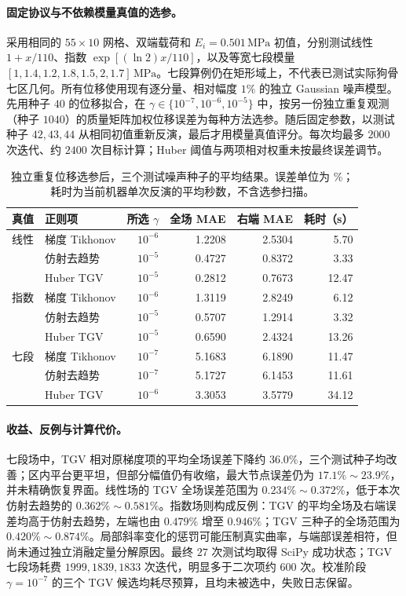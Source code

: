 \documentclass[11pt,a4paper]{ctexart}
\begin{document}
\paragraph{固定协议与不依赖模量真值的选参。}
采用相同的 $55\times10$ 网格、双端载荷和 $E_i=0.501\,\mathrm{MPa}$ 初值，分别测试线性 $1+x/110$、指数 $\exp[(\ln2)x/110]$，以及等宽七段模量 $[1,1.4,1.2,1.8,1.5,2,1.7]\,\mathrm{MPa}$。七段算例仍在矩形域上，不代表已测试实际狗骨七区几何。所有位移使用现有逐分量、相对幅度 $1\%$ 的独立 Gaussian 噪声模型。先用种子 $40$ 的位移拟合，在 $\gamma\in\{10^{-7},10^{-6},10^{-5}\}$ 中，按另一份独立重复观测（种子 $1040$）的质量矩阵加权位移误差为每种方法选参。随后固定参数，以测试种子 $42,43,44$ 从相同初值重新反演，最后才用模量真值评分。每次均最多 $2000$ 次迭代、约 $2400$ 次目标计算；Huber 阈值与两项相对权重未按最终误差调节。

\begin{table}[htbp]
\centering
\small
\caption{独立重复位移选参后，三个测试噪声种子的平均结果。误差单位为 \%；耗时为当前机器单次反演的平均秒数，不含选参扫描。}
\label{tab:tgv_results}
\begin{tabular}{llrrrr}
\toprule
真值 & 正则项 & 所选 $\gamma$ & 全场 MAE & 右端 MAE & 耗时（s） \\
\midrule
线性 & 梯度 Tikhonov & $10^{-6}$ & 1.2208 & 2.5304 & 5.70 \\
 & 仿射去趋势 & $10^{-5}$ & 0.4727 & 0.8372 & 3.33 \\
 & Huber TGV & $10^{-5}$ & 0.2812 & 0.7673 & 12.47 \\
指数 & 梯度 Tikhonov & $10^{-6}$ & 1.3119 & 2.8249 & 6.12 \\
 & 仿射去趋势 & $10^{-5}$ & 0.5707 & 1.2914 & 3.32 \\
 & Huber TGV & $10^{-5}$ & 0.6590 & 2.4324 & 13.26 \\
七段 & 梯度 Tikhonov & $10^{-7}$ & 5.1683 & 6.1890 & 11.47 \\
 & 仿射去趋势 & $10^{-7}$ & 5.1727 & 6.1453 & 11.61 \\
 & Huber TGV & $10^{-6}$ & 3.3053 & 3.5779 & 34.12 \\
\bottomrule
\end{tabular}
\end{table}

\paragraph{收益、反例与计算代价。}
七段场中，TGV 相对原梯度项的平均全场误差下降约 $36.0\%$，三个测试种子均改善；区内平台更平坦，但部分幅值仍有收缩，最大节点误差仍为 $17.1\%\sim23.9\%$，并未精确恢复界面。线性场的 TGV 全场误差范围为 $0.234\%\sim0.372\%$，低于本次仿射去趋势的 $0.362\%\sim0.581\%$。指数场则构成反例：TGV 的平均全场及右端误差均高于仿射去趋势，左端也由 $0.479\%$ 增至 $0.946\%$；TGV 三种子的全场范围为 $0.420\%\sim0.874\%$。局部斜率变化的惩罚可能压制真实曲率，与端部误差相符，但尚未通过独立消融定量分解原因。最终 $27$ 次测试均取得 SciPy 成功状态；TGV 七段场耗费 $1999,1839,1833$ 次迭代，明显多于二次项约 $600$ 次。校准阶段 $\gamma=10^{-7}$ 的三个 TGV 候选均耗尽预算，且均未被选中，失败日志保留。
\end{document}

